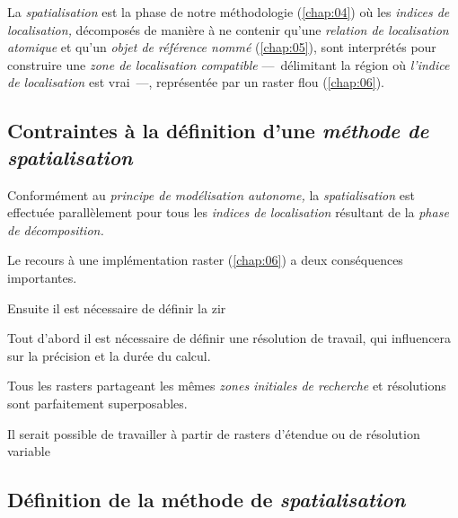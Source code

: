 La \emph{spatialisation} est la phase de notre méthodologie
(\autoref{chap:04}) où les \emph{indices de localisation,} décomposés
de manière à ne contenir qu'une \emph{relation de localisation
  atomique} et qu'un \emph{objet de référence nommé}
(\autoref{chap:05}), sont interprétés pour construire une \emph{zone
  de localisation compatible} ---~délimitant la région où
\emph{l'indice de localisation} est vrai~---, représentée par un
raster flou (\autoref{chap:06}).

\subsection{Contraintes à la définition d'une \emph{méthode de spatialisation}}


%
Conformément au \emph{principe de modélisation autonome,} la
\emph{spatialisation} est effectuée parallèlement pour tous les
\emph{indices de localisation} résultant de la \emph{phase de
  décomposition.}

Le recours à une implémentation raster (\autoref{chap:06}) a deux
conséquences importantes.

%
Ensuite il est nécessaire de définir la \ac{zir}

%
Tout d'abord il est nécessaire de définir une résolution de travail,
qui influencera sur la précision et la durée du calcul.

Tous les rasters partageant les mêmes \emph{zones initiales de
  recherche} et résolutions sont parfaitement superposables.

%
Il serait possible de travailler à partir de rasters d'étendue ou de
résolution variable




\subsection{Définition de la méthode de \emph{spatialisation}}

